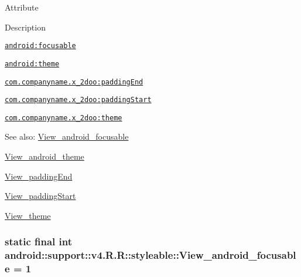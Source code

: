 Attribute

Description 

{\tt \hyperlink{classandroid_1_1support_1_1v4_1_1_r_1_1styleable_aee6d63750b2dba7fdc9fbb4e30b5406}{android:focusable}}

{\tt \hyperlink{classandroid_1_1support_1_1v4_1_1_r_1_1styleable_26f4118fb592f19ebed8ecd1a890f65e}{android:theme}}

{\tt \hyperlink{classandroid_1_1support_1_1v4_1_1_r_1_1styleable_d641d27f14bbb0e085ee8f2086bfe3ee}{com.companyname.x\_\-2doo:paddingEnd}}

{\tt \hyperlink{classandroid_1_1support_1_1v4_1_1_r_1_1styleable_7f4d8c133f2bc4da71daa16cdc57307b}{com.companyname.x\_\-2doo:paddingStart}}

{\tt \hyperlink{classandroid_1_1support_1_1v4_1_1_r_1_1styleable_476575738874837ba5b44a1c9cedb790}{com.companyname.x\_\-2doo:theme}}

\begin{Desc}
\item[See also:]\hyperlink{classandroid_1_1support_1_1v4_1_1_r_1_1styleable_aee6d63750b2dba7fdc9fbb4e30b5406}{View\_\-android\_\-focusable} 

\hyperlink{classandroid_1_1support_1_1v4_1_1_r_1_1styleable_26f4118fb592f19ebed8ecd1a890f65e}{View\_\-android\_\-theme} 

\hyperlink{classandroid_1_1support_1_1v4_1_1_r_1_1styleable_d641d27f14bbb0e085ee8f2086bfe3ee}{View\_\-paddingEnd} 

\hyperlink{classandroid_1_1support_1_1v4_1_1_r_1_1styleable_7f4d8c133f2bc4da71daa16cdc57307b}{View\_\-paddingStart} 

\hyperlink{classandroid_1_1support_1_1v4_1_1_r_1_1styleable_476575738874837ba5b44a1c9cedb790}{View\_\-theme} \end{Desc}
\hypertarget{classandroid_1_1support_1_1v4_1_1_r_1_1styleable_aee6d63750b2dba7fdc9fbb4e30b5406}{
\subsubsection[{View\_\-android\_\-focusable}]{\setlength{\rightskip}{0pt plus 5cm}static final int android::support::v4.R.R::styleable::View\_\-android\_\-focusable = 1}}
\label{classandroid_1_1support_1_1v4_1_1_r_1_1styleable_aee6d63750b2dba7fdc9fbb4e30b5406}


